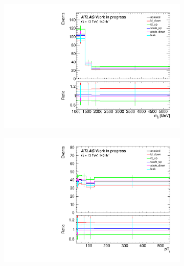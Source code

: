 \begin{figure}[t]
\centering
\begin{subfigure}[b]{0.48\textwidth}
    \centering
    \includegraphics[width=\textwidth]{plots/diffx/ratio_mjj_jfakey.pdf}
    \caption{}
\end{subfigure}
\hfill
\begin{subfigure}[b]{0.48\textwidth}
    \centering
    \includegraphics[width=\textwidth]{plots/diffx/ratio_lep_pt_jfakey.pdf}
    \caption{}
\end{subfigure}

\end{figure}
